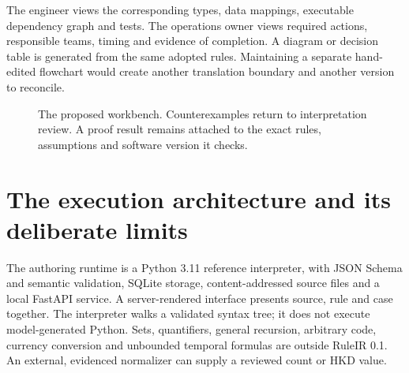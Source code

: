 The engineer views the corresponding types, data mappings, executable dependency
graph and tests. The operations owner views required actions, responsible teams,
timing and evidence of completion. A diagram or decision table is generated from
the same adopted rules. Maintaining a separate hand-edited flowchart would create
another translation boundary and another version to reconcile.

\begin{figure}[htbp]
\centering
{}
\caption{The proposed workbench. Counterexamples return to interpretation review.
A proof result remains attached to the exact rules, assumptions and software
version it checks.}
\label{fig:architecture}
\end{figure}

\section{The execution architecture and its deliberate limits}
\label{merge:P-03-product:07}


The authoring runtime is a Python 3.11 reference interpreter, with JSON Schema and
semantic validation, SQLite storage, content-addressed source files and a local
FastAPI service. A server-rendered interface presents source, rule and case
together. The interpreter walks a validated syntax tree; it does not execute
model-generated Python. Sets, quantifiers, general recursion, arbitrary code,
currency conversion and unbounded temporal formulas are outside RuleIR 0.1.
An external, evidenced normalizer can supply a reviewed count or HKD value.

